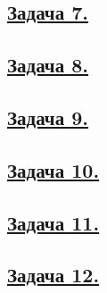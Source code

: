 \subsection*{\hyperref[sec:problem7]{Задача 7.}}\label{sec:sol_problem7}

\subsection*{\hyperref[sec:problem8]{Задача 8.}}\label{sec:sol_problem8}

\subsection*{\hyperref[sec:problem9]{Задача 9.}}\label{sec:sol_problem9}

\subsection*{\hyperref[sec:problem10]{Задача 10.}}\label{sec:sol_problem10}

\subsection*{\hyperref[sec:problem11]{Задача 11.}}\label{sec:sol_problem11}

\subsection*{\hyperref[sec:problem12]{Задача 12.}}\label{sec:sol_problem12}